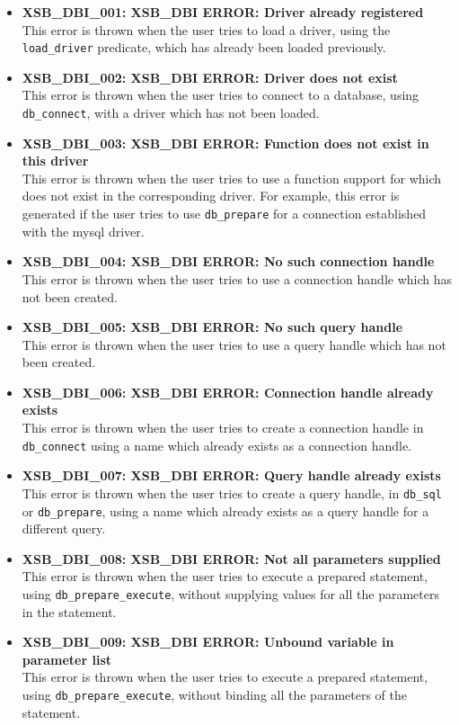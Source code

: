 \begin{itemize}

\item {\bf XSB\_DBI\_001: XSB\_DBI ERROR: Driver already registered}\\
This error is thrown when the user tries to load a driver, using the {\tt load\_driver} 
predicate, which has already been loaded previously.

\item {\bf XSB\_DBI\_002: XSB\_DBI ERROR: Driver does not exist}\\
This error is thrown when the user tries to connect to a database, using
{\tt db\_connect}, with a driver which has not been loaded.

\item {\bf XSB\_DBI\_003: XSB\_DBI ERROR: Function does not exist in this driver}\\
This error is thrown when the user tries to use a function support 
for which does not exist in the corresponding driver. For example, 
this error is generated if the user
tries to use {\tt db\_prepare} for a connection established with the
mysql driver.

\item {\bf XSB\_DBI\_004: XSB\_DBI ERROR: No such connection handle}\\
This error is thrown when the user tries to use a connection handle
which has not been created.

\item {\bf XSB\_DBI\_005: XSB\_DBI ERROR: No such query handle}\\
This error is thrown when the user tries to use a query handle which has 
not been created.

\item {\bf XSB\_DBI\_006: XSB\_DBI ERROR: Connection handle already exists}\\
This error is thrown when the user tries to create a connection handle in
{\tt db\_connect} using a name which already exists as a connection handle.

\item {\bf XSB\_DBI\_007: XSB\_DBI ERROR: Query handle already exists}\\
This error is thrown when the user tries to create a query handle, in
{\tt db\_sql} or {\tt db\_prepare}, using a name which already exists as
a query handle for a different query.

\item {\bf XSB\_DBI\_008: XSB\_DBI ERROR: Not all parameters supplied}\\
This error is thrown when the user tries to execute a prepared statement,
using {\tt db\_prepare\_execute}, without supplying values for all the
parameters in the statement.

\item {\bf XSB\_DBI\_009: XSB\_DBI ERROR: Unbound variable in parameter list}\\
This error is thrown when the user tries to execute a prepared statement,
using {\tt db\_prepare\_execute}, without binding all the parameters of the
statement.

\end{itemize}

